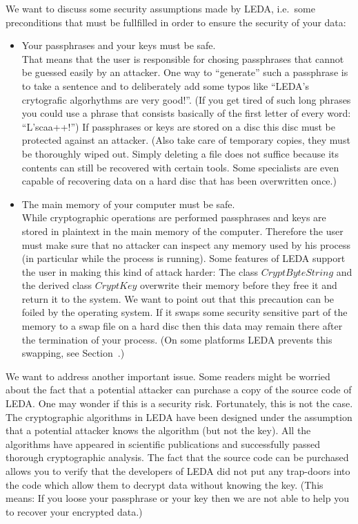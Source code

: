 We want to discuss some security assumptions made by LEDA, i.e.~some
preconditions that must be fullfilled in order to ensure the security of your
data:
\begin{itemize}
\item Your passphrases and your keys must be safe.\\
That means that the user is responsible for chosing passphrases that cannot be
guessed easily by an attacker. One way to ``generate'' such a passphrase is to
take a sentence and to deliberately add some typos like ``LEDA's crytografic
algorhythms are very good!''. (If you get tired of such long phrases you could
use a phrase that consists basically of the first letter of every word: 
``L'scaa++!'')
If passphrases or keys are stored on a disc this disc must be protected
against an attacker. (Also take care of temporary copies, they must be
thoroughly wiped out. Simply deleting a file does not suffice because its
contents can still be recovered with certain tools. Some specialists are even
capable of recovering data on a hard disc that has been overwritten once.)
\item The main memory of your computer must be safe.\\
While cryptographic operations are performed passphrases and keys are stored
in plaintext in the main memory of the computer.
Therefore the user must make sure that no attacker can inspect any memory used
by his process (in particular while the process is running).
Some features of LEDA support the user in making this kind of attack harder:
The class $\mathit{CryptByteString}$ and the derived class $\mathit{CryptKey}$
overwrite their memory before they free it and return it to the system. 
We want to point out that this precaution can be foiled by the operating
system. If it swaps some security sensitive part of the memory to a swap file
on a hard disc then this data may remain there after the termination of your
process. 
(On some platforms LEDA prevents this swapping, see Section~.) 
\end{itemize}

We want to address another important issue. Some readers might be worried about
the fact that a potential attacker can purchase a copy of the source code of
LEDA. One may wonder if this is a security risk. Fortunately, this is not the 
case.
The cryptographic algorithms in LEDA have been designed under the assumption
that a potential attacker knows the algorithm (but not the key). 
All the algorithms have appeared in scientific publications and successfully 
passed thorough cryptographic analysis. 
The fact that the source code can be purchased allows you to verify that the
developers of LEDA did not put any trap-doors into the code which allow 
them to decrypt data without knowing the key. 
(This means: If you loose your passphrase or your key then we are not
able to help you to recover your encrypted data.)


